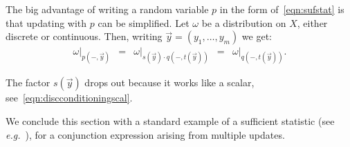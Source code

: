 \documentclass{mscs}
\begin{document}
The big advantage of writing a random variable $p$ in the form
of~\eqref{eqn:sufstat} is that updating with $p$ can be
simplified. Let $\omega$ be a distribution on $X$, either discrete or
continuous. Then, writing $\vec{y} = (y_{1}, \ldots, y_{m})$ we get:
\[ \begin{array}{rcccl}
\omega|_{p(-,\vec{y})}
& = &
\omega|_{s(\vec{y})\cdot q(-,t(\vec{y}))}
& = &
\omega|_{q(-,t(\vec{y}))}.
\end{array} \]

\noindent The factor $s(\vec{y})$ drops out because it works
like a scalar, see~\eqref{eqn:discconditioningscal}.

We conclude this section with a standard example of a sufficient
statistic (see \textit{e.g.}~\cite{Bishop06}), for a conjunction
expression arising from multiple updates.
\end{document}
